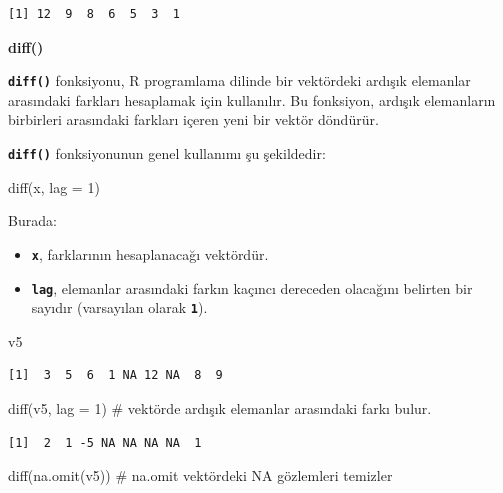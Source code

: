 \documentclass[
  letterpaper,
  DIV=11,
  numbers=noendperiod]{scrreprt}
\newenvironment{Shaded}{\begin{snugshade}}{\end{snugshade}}
\newcommand{\AttributeTok}[1]{\textcolor[rgb]{0.40,0.45,0.13}{#1}}
\newcommand{\CommentTok}[1]{\textcolor[rgb]{0.37,0.37,0.37}{#1}}
\newcommand{\DecValTok}[1]{\textcolor[rgb]{0.68,0.00,0.00}{#1}}
\newcommand{\FunctionTok}[1]{\textcolor[rgb]{0.28,0.35,0.67}{#1}}
\newcommand{\NormalTok}[1]{\textcolor[rgb]{0.00,0.23,0.31}{#1}}
\begin{document}
\begin{verbatim}
[1] 12  9  8  6  5  3  1
\end{verbatim}

\textbf{diff()}

\textbf{\texttt{diff()}} fonksiyonu, R programlama dilinde bir
vektördeki ardışık elemanlar arasındaki farkları hesaplamak için
kullanılır. Bu fonksiyon, ardışık elemanların birbirleri arasındaki
farkları içeren yeni bir vektör döndürür.

\textbf{\texttt{diff()}} fonksiyonunun genel kullanımı şu şekildedir:

\begin{Shaded}
\begin{Highlighting}[]
\FunctionTok{diff}\NormalTok{(x, }\AttributeTok{lag =} \DecValTok{1}\NormalTok{)}
\end{Highlighting}
\end{Shaded}

Burada:

\begin{itemize}
\item
  \textbf{\texttt{x}}, farklarının hesaplanacağı vektördür.
\item
  \textbf{\texttt{lag}}, elemanlar arasındaki farkın kaçıncı dereceden
  olacağını belirten bir sayıdır (varsayılan olarak
  \textbf{\texttt{1}}).
\end{itemize}

\begin{Shaded}
\begin{Highlighting}[]
\NormalTok{v5}
\end{Highlighting}
\end{Shaded}

\begin{verbatim}
[1]  3  5  6  1 NA 12 NA  8  9
\end{verbatim}

\begin{Shaded}
\begin{Highlighting}[]
\FunctionTok{diff}\NormalTok{(v5,  }\AttributeTok{lag =} \DecValTok{1}\NormalTok{) }\CommentTok{\# vektörde ardışık elemanlar arasındaki farkı bulur.}
\end{Highlighting}
\end{Shaded}

\begin{verbatim}
[1]  2  1 -5 NA NA NA NA  1
\end{verbatim}

\begin{Shaded}
\begin{Highlighting}[]
\FunctionTok{diff}\NormalTok{(}\FunctionTok{na.omit}\NormalTok{(v5)) }\CommentTok{\# na.omit vektördeki NA gözlemleri temizler}
\end{Highlighting}
\end{Shaded}
\end{document}
